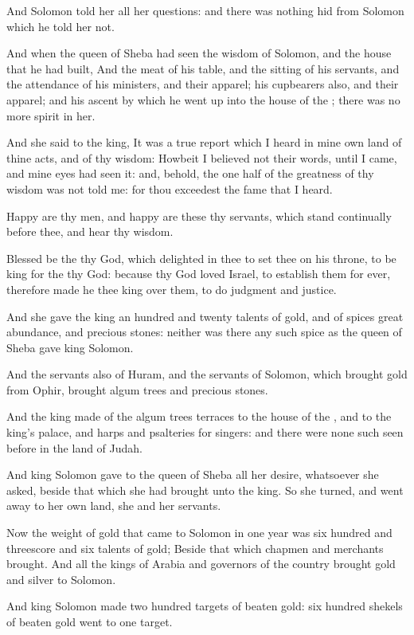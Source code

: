 \Verse And Solomon told her all her questions: and there was nothing hid from Solomon which he told her not.

\Verse And when the queen of Sheba had seen the wisdom of Solomon, and the house that he had built, \Verse And the meat of his table, and the sitting of his servants, and the attendance of his ministers, and their apparel; his cupbearers also, and their apparel; and his ascent by which he went up into the house of the \LORD; there was no more spirit in her.

\Verse And she said to the king, It was a true report which I heard in mine own land of thine acts, and of thy wisdom: \Verse Howbeit I believed not their words, until I came, and mine eyes had seen it: and, behold, the one half of the greatness of thy wisdom was not told me: for thou exceedest the fame that I heard.

\Verse Happy are thy men, and happy are these thy servants, which stand continually before thee, and hear thy wisdom.

\Verse Blessed be the \LORD thy God, which delighted in thee to set thee on his throne, to be king for the \LORD thy God: because thy God loved Israel, to establish them for ever, therefore made he thee king over them, to do judgment and justice.

\Verse And she gave the king an hundred and twenty talents of gold, and of spices great abundance, and precious stones: neither was there any such spice as the queen of Sheba gave king Solomon.

\Verse And the servants also of Huram, and the servants of Solomon, which brought gold from Ophir, brought algum trees and precious stones.

\Verse And the king made of the algum trees terraces to the house of the \LORD, and to the king's palace, and harps and psalteries for singers: and there were none such seen before in the land of Judah.

\Verse And king Solomon gave to the queen of Sheba all her desire, whatsoever she asked, beside that which she had brought unto the king.  So she turned, and went away to her own land, she and her servants.

\Verse Now the weight of gold that came to Solomon in one year was six hundred and threescore and six talents of gold; \Verse Beside that which chapmen and merchants brought. And all the kings of Arabia and governors of the country brought gold and silver to Solomon.

\Verse And king Solomon made two hundred targets of beaten gold: six hundred shekels of beaten gold went to one target.

